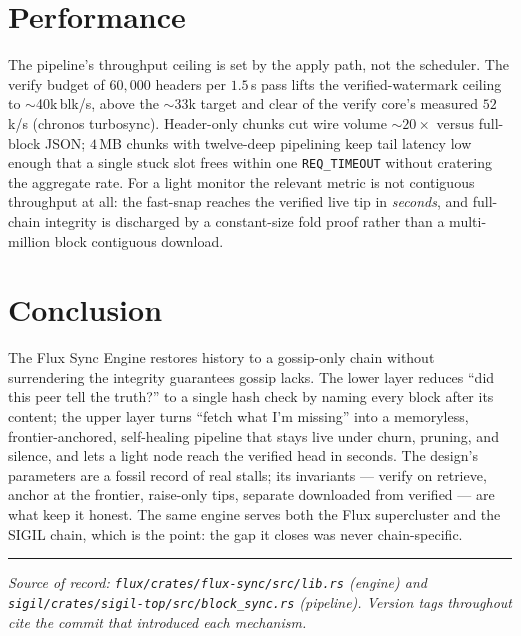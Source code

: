 \documentclass[11pt,a4paper]{article}
\begin{document}
\section{Performance}

The pipeline's throughput ceiling is set by the apply path, not the scheduler.
The verify budget of $60{,}000$ headers per $1.5$\,s pass lifts the
verified-watermark ceiling to $\sim$40k\,blk/s, above the $\sim$33k target and
clear of the verify core's measured $52$k/s (chronos turbosync). Header-only
chunks cut wire volume $\sim$$20\times$ versus full-block JSON; $4$\,MB chunks
with twelve-deep pipelining keep tail latency low enough that a single stuck slot
frees within one \texttt{REQ\_TIMEOUT} without cratering the aggregate rate. For a
light monitor the relevant metric is not contiguous throughput at all: the
fast-snap reaches the verified live tip in \emph{seconds}, and full-chain
integrity is discharged by a constant-size fold proof rather than a multi-million
block contiguous download.

\section{Conclusion}

The Flux Sync Engine restores history to a gossip-only chain without surrendering
the integrity guarantees gossip lacks. The lower layer reduces ``did this peer
tell the truth?'' to a single hash check by naming every block after its content;
the upper layer turns ``fetch what I'm missing'' into a memoryless,
frontier-anchored, self-healing pipeline that stays live under churn, pruning, and
silence, and lets a light node reach the verified head in seconds. The design's
parameters are a fossil record of real stalls; its invariants --- verify on
retrieve, anchor at the frontier, raise-only tips, separate downloaded from
verified --- are what keep it honest. The same engine serves both the Flux
supercluster and the SIGIL chain, which is the point: the gap it closes was never
chain-specific.

\vspace{1em}
\hrule
\vspace{0.6em}
\noindent\footnotesize\textit{Source of record: \texttt{flux/crates/flux-sync/src/lib.rs}
(engine) and \texttt{sigil/crates/sigil-top/src/block\_sync.rs} (pipeline).
Version tags throughout cite the commit that introduced each mechanism.}
\end{document}
